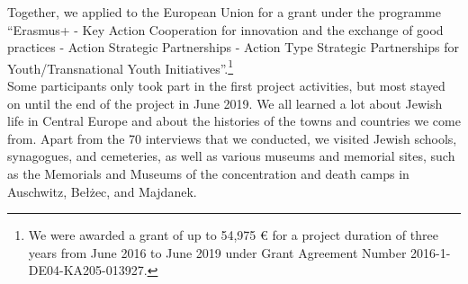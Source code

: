 Together, we applied to the European Union for a grant under the programme ``Erasmus+ - Key Action Cooperation for innovation and the exchange of good practices - Action Strategic Partnerships - Action Type Strategic Partnerships for Youth/Transnational Youth Initiatives''.\footnote{We were awarded a grant of up to 54,975 \euro{} for a project duration of three years from June 2016 to June 2019 under Grant Agreement Number 2016-1-DE04-KA205-013927.} \\
Some participants only took part in the first project activities, but most stayed on until the end of the project in June 2019. We all learned a lot about Jewish life in Central Europe and about the histories of the towns and countries we come from. Apart from the 70 interviews that we conducted, we visited Jewish schools, synagogues, and cemeteries, as well as various museums and memorial sites, such as the Memorials and Museums of the concentration and death camps in Auschwitz, Bełżec, and Majdanek. 
